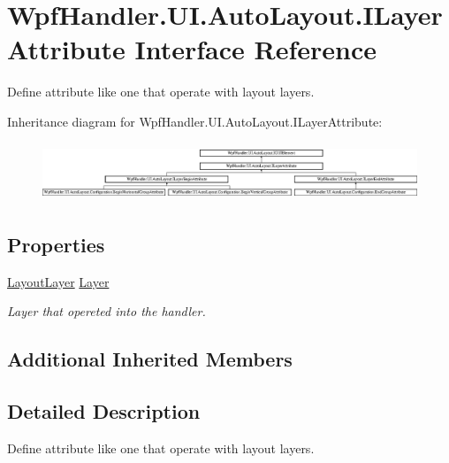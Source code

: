 \hypertarget{interface_wpf_handler_1_1_u_i_1_1_auto_layout_1_1_i_layer_attribute}{}\section{Wpf\+Handler.\+U\+I.\+Auto\+Layout.\+I\+Layer\+Attribute Interface Reference}
\label{interface_wpf_handler_1_1_u_i_1_1_auto_layout_1_1_i_layer_attribute}


Define attribute like one that operate with layout layers.  


Inheritance diagram for Wpf\+Handler.\+U\+I.\+Auto\+Layout.\+I\+Layer\+Attribute\+:\begin{figure}[H]
\begin{center}
\leavevmode
\includegraphics[height=1.756863cm]{d7/d70/interface_wpf_handler_1_1_u_i_1_1_auto_layout_1_1_i_layer_attribute}
\end{center}
\end{figure}
\subsection*{Properties}
\begin{DoxyCompactItemize}
\item 
\mbox{\hyperlink{class_wpf_handler_1_1_u_i_1_1_auto_layout_1_1_layout_layer}{Layout\+Layer}} \mbox{\hyperlink{interface_wpf_handler_1_1_u_i_1_1_auto_layout_1_1_i_layer_attribute_a0af8e554e80237be99bf7927749ff49f}{Layer}}
\begin{DoxyCompactList}\small\item\em Layer that opereted into the handler. \end{DoxyCompactList}\end{DoxyCompactItemize}
\subsection*{Additional Inherited Members}


\subsection{Detailed Description}
Define attribute like one that operate with layout layers. 



